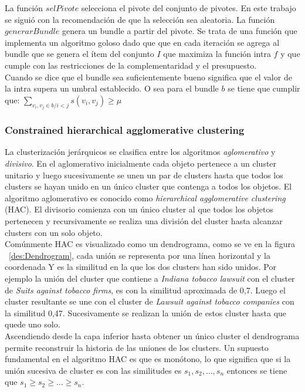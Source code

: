 La función $selPivote$ selecciona el pivote del conjunto de pivotes. En este trabajo se siguió con la recomendación de \cite{newSimilarity} que la selección sea aleatoria. La función $generarBundle$ genera un bundle a partir del pivote. Se trata de una función que implementa un algoritmo goloso dado que que en cada iteración se agrega al bundle que se genera el ítem del conjunto $I$ que maximiza la función intra $f$ y que cumple con las restricciones de la complementaridad y el presupuesto.\\
Cuando se dice que el bundle sea suficientemente bueno significa que el valor de la intra supera un umbral establecido. O sea para el bundle $b$ se tiene que cumplir que: $\sum_{v_i, v_j \in b / i < j}{s(v_i,v_j)} \geq \mu$\\

\subsubsection{Constrained hierarchical agglomerative clustering}
La clusterización jerárquicos se clasifica entre los algoritmos \textit{aglomerativo} y \textit{divisivo}. En el aglomerativo inicialmente cada objeto pertenece a un cluster unitario y luego sucesivamente se unen un par de clusters hasta que todos los clusters se hayan unido en un único cluster que contenga a todos los objetos. El algoritmo aglomerativo es conocido como \textit{hierarchical agglomerative clustering} (HAC). El divisorio comienza con un único cluster al que todos los objetos pertenecen y recursivamente se realiza una división del cluster hasta alcanzar clusters con un solo objeto.\\
Comúnmente HAC es visualizado como un dendrograma, como se ve en la figura ~\ref{des:Dendrogram}, cada unión se representa por una línea horizontal y la coordenada Y es la similitud en la que los dos clusters han sido unidos. Por ejemplo la unión del cluster que contiene a \textit{Indiana tobacco lawsuit} con el cluster de \textit{Suits against tobacco firms}, es con la similitud aproximada de 0,7. Luego el cluster resultante se une con el cluster de \textit{Lawsuit against tobacco companies} con la similitud 0,47. Sucesivamente se realizan la unión de estos cluster hasta que quede uno solo.\\
Ascendiendo desde la capa inferior hasta obtener un único cluster el dendrograma permite reconstruir la historia de las uniones de los clusters. Un supuesto fundamental en el algoritmo HAC es que es monótono, lo que significa que si la unión sucesiva de cluster es con las similitudes es $s_1,s_2,\ldots,s_n$ entonces se tiene que $s_1 \geq s_2 \geq \ldots \geq s_n$.\\

